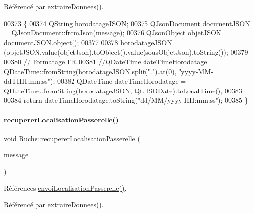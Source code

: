 Référencé par \hyperlink{class_ruche_a21c0dafeaec03d451590037343e6a3ca}{extraire\+Donnees()}.


\begin{DoxyCode}
00373 \{
00374     QString horodatageJSON;
00375     QJsonDocument documentJSON = QJsonDocument::fromJson(message);
00376     QJsonObject objetJSON = documentJSON.object();
00377 
00378     horodatageJSON = (objetJSON.value(objetJson).toObject().value(sousObjetJson).toString());
00379 
00380     \textcolor{comment}{// Formatage FR}
00381     \textcolor{comment}{//QDateTime dateTimeHorodatage = QDateTime::fromString(horodatageJSON.split(".").at(0),
       "yyyy-MM-ddTHH:mm:ss");}
00382     QDateTime dateTimeHorodatage = QDateTime::fromString(horodatageJSON, Qt::ISODate).toLocalTime();
00383 
00384     \textcolor{keywordflow}{return} dateTimeHorodatage.toString(\textcolor{stringliteral}{"dd/MM/yyyy HH:mm:ss"});
00385 \}
\end{DoxyCode}
\mbox{\label{class_ruche_abdb0503e660631a0a9d2ed7177918341}} 
\paragraph{\texorpdfstring{recuperer\+Localisation\+Passerelle()}{recupererLocalisationPasserelle()}}
{\footnotesize\ttfamily void Ruche\+::recuperer\+Localisation\+Passerelle (\begin{DoxyParamCaption}\item[{Q\+Byte\+Array}]{message }\end{DoxyParamCaption})\hspace{0.3cm}{\ttfamily [private]}}



Références \hyperlink{class_ruche_a2a0f122bfd939419f40facf41e91fe30}{envoi\+Localisation\+Passerelle()}.



Référencé par \hyperlink{class_ruche_a21c0dafeaec03d451590037343e6a3ca}{extraire\+Donnees()}.


